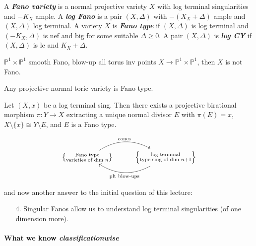 \begin{defn}
	A \textit{\textbf{Fano variety}} is a normal projective variety $X$ with log terminal singularities and $-K_{X}$ ample. A \textit{\textbf{log Fano}} is a pair $(X,\Delta)$ with $-(X_{X}+\Delta)$ ample and $(X,\Delta)$ log terminal. A variety $X$ is \textit{\textbf{Fano type}} if $(X,\Delta)$ is log terminal and $(-K_{X},\Delta)$ is nef and big for some suitable $\Delta \geq 0$. A pair $(X,\Delta)$ is \textit{\textbf{log CY}} if $(X,\Delta)$ is lc and $K_{X}+\Delta$.
\end{defn}

\begin{exercise}
	$\mathbb{P}^{1} \times \mathbb{P}^{1}$ smooth Fano, blow-up all torus inv points $X\to \mathbb{P}^{1} \times \mathbb{P}^{1}$, then $X$ is not Fano.
\end{exercise}

\begin{remark}
	Any projective normal toric variety is Fano type.
\end{remark}

\begin{thm}[Prokhorov, X 14]\leavevmode
	Let $(X,x)$ be a log terminal sing. Then there exists a projective birational morphism $\pi:Y\to  X$ extracting a unique normal divisor $E$ with $\pi(E)=x$, $X\setminus \{x\} \cong Y\setminus E$, and $E$ is a Fano type.
\end{thm}

\[\begin{tikzcd}
	\left\{ \substack{\text{Fano type}  \\ \text{varieties of dim } n}  \right\} \arrow[r,"\text{cones} ",bend left]&\left\{ \substack{\text{log terminal}  \\ \text{type sing of dim } n+1} \right\} \arrow[l,bend left,"\text{plt blow-ups} "]
\end{tikzcd}\]

and now another answer to the initial question of this lecture:

\begin{enumerate}
	\item[4.] Singular Fanos allow us to understand log terminal singularities (of one dimension more).
\end{enumerate}

\paragraph{What we know \textit{classificationwise}}

